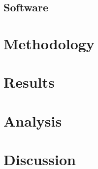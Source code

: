 \documentclass[sigconf,nonacm]{acmart}
\begin{document}
\subsection{Software}

\label{sec:software_setup}

\section{Methodology}

\label{sec:methodology}

\section{Results}

\label{sec:results}

\section{Analysis}

\label{sec:analysis}

\section{Discussion}

\label{sec:discussion}





\end{document}
